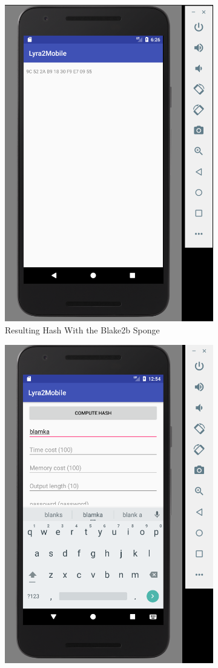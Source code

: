 \begin{figure}[H]
\begin{subfigure}{.5\textwidth}
  \includegraphics[width=.8\linewidth]{figures/lyra2-mobile-result-clean}
  \caption{Resulting Hash With the Blake2b Sponge}
  \label{fig:lyra2-mobile-result-blake2b}
\end{subfigure}
\begin{subfigure}{.5\textwidth}
  \centering
  \includegraphics[width=.8\linewidth]{figures/lyra2-mobile-main-blamka-clean}

\end{subfigure}
\end{figure}
